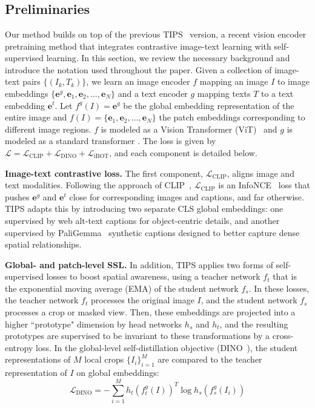 \section{\textbf{\tipsvtwo}} \label{sec:method}

\subsection{Preliminaries} \label{sec:preliminaries}

Our method builds on top of the previous TIPS~\cite{tips_paper} version, a recent vision encoder pretraining method that integrates contrastive image-text learning with self-supervised learning.
In this section, we review the necessary background and introduce the notation used throughout the paper.
Given a collection of image-text pairs $\{(I_k,T_k)\}$, we learn an image encoder $f$ mapping an image $I$ to image embeddings $\{\mathbf e^g,\mathbf e_1,\mathbf e_2,\ldots,\mathbf e_N\}$
and a text encoder $g$ mapping texts $T$ to a text embedding $\mathbf e^t$. Let $f^g(I)=\mathbf e^g$ be the global embedding representation of the entire image and $f(I)=\{\mathbf e_1,\mathbf e_2,\ldots,\mathbf e_N\}$ the patch embeddings corresponding to different image regions. 
$f$ is modeled as a Vision Transformer (ViT)~\citep{dosovitskiy2020vit} and $g$ is modeled as a standard transformer \citep{vaswani2017attention}. The loss is given by $\mathcal{L} = \mathcal{L}_\text{CLIP} + \mathcal{L}_\text{DINO} + \mathcal{L}_\text{iBOT}$, and each component is detailed below.

\noindent\textbf{Image-text contrastive loss.} The first component, $\mathcal{L}_\text{CLIP}$, aligns image and text modalities. Following the approach of CLIP~\citep{radford2021clip}, $\mathcal{L}_\text{CLIP}$ is an InfoNCE~\citep{oord2018infonce} loss that pushes $\mathbf e^g$ and $\mathbf e^t$ close for corresponding images and captions, and far otherwise. TIPS adapts this by introducing two separate CLS global embeddings: one supervised by web alt-text captions for object-centric details, and another supervised by PaliGemma~\citep{beyer2024paligemma} synthetic captions designed to better capture dense spatial relationships. 

\noindent\textbf{Global- and patch-level SSL.}
In addition, TIPS applies two forms of self-supervised losses to boost spatial awareness, using a teacher network $f_t$ that is the exponential moving average (EMA) of the student network $f_s$. In these losses, the teacher network $f_t$ processes the original image $I$, and the student network $f_s$ processes a crop or masked view. Then, these embeddings are projected into a higher ``prototype" dimension by head networks $h_s$ and $h_t$, and the resulting prototypes are supervised to be invariant to these transformations by a cross-entropy loss.
In the global-level self-distillation objective (DINO~\citep{caron2021dino}), the student representations of $M$ local crops $\{I_i\}_{i=1}^M$ are compared to the teacher representation of $I$ on global embeddings:
\begin{equation}
    \label{eq:dino_loss}
        \mathcal{L}_\text{DINO} = - \sum_{i=1}^M  h_t(f_t^g(I))^T \log h_s(f_s^g(I_i))
\end{equation}


